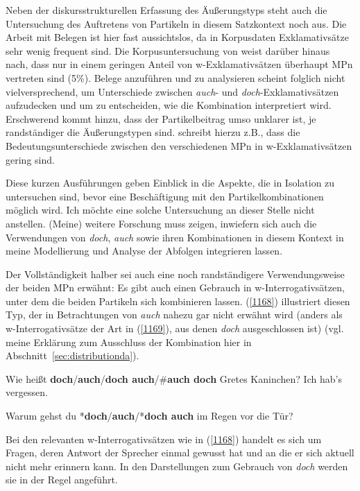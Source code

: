 {Neben der diskursstrukturellen Erfassung des Äußerungstyps steht auch die Untersuchung des Auftretens von Partikeln in diesem Satzkontext noch aus. Die Arbeit mit Belegen ist hier fast aussichtslos, da in Korpusdaten Exklamativsätze sehr wenig frequent sind. Die Korpusuntersuchung von \citet{Naef1996} weist darüber hinaus nach, dass nur in einem geringen Anteil von w-Exklamativsätzen  überhaupt MPn vertreten sind (5\%). Belege anzuführen und zu analysieren scheint folg\-lich nicht vielversprechend, um Unterschiede zwischen \textit{auch}- und \textit{doch}-Exkla\-mativsätzen aufzudecken und um zu entscheiden, wie die Kombination interpretiert wird. Erschwerend kommt hinzu, dass der Partikelbeitrag umso unklarer ist, je randständiger die Äußerungstypen sind. \citet[637]{Thurmair2013} schreibt hierzu z.B., dass die Bedeutungsunterschiede zwischen den verschiedenen MPn in w-Exklamativsätzen gering sind. 

Diese kurzen Ausführungen geben Einblick in die Aspekte, die in Isolation zu untersuchen sind, bevor eine Beschäftigung mit den Partikelkombinationen möglich wird. Ich möchte eine solche Untersuchung an dieser Stelle nicht anstellen. (Meine) weitere Forschung muss zeigen, inwiefern sich auch die Verwendungen von \textit{doch}, \textit{auch} sowie ihren Kombinationen in diesem Kontext in meine Modellierung und Analyse der Abfolgen integrieren lassen.

Der Vollständigkeit halber sei auch eine noch randständigere Verwendungsweise der beiden MPn erwähnt: Es gibt auch einen Gebrauch in w-Interrogativsätzen,  unter dem die beiden Partikeln sich kombinieren lassen. (\ref{1168}) illustriert diesen Typ, der in Betrachtungen von \textit{auch} nahezu gar nicht erwähnt wird (anders als w-Interrogativsätze der Art in (\ref{1169}), aus denen \textit{doch} ausgeschlossen ist) (vgl. meine Erklärung zum Ausschluss der Kombination hier in Abschnitt~\ref{sec:distributionda}).

\begin{exe}
	\ex\label{1168} 
	Wie heißt \textbf{doch}/\textbf{auch}/\textbf{doch auch}/\#\textbf{auch doch} Gretes Kaninchen? Ich hab's vergessen.
\end{exe}
\vspace{-0.6cm}	
\begin{exe}
	\ex\label{1169} 
	Warum gehst du *\textbf{doch}/\textbf{auch}/*\textbf{doch auch} im Regen vor die Tür?
\end{exe}	
Bei den relevanten w-Interrogativsätzen wie in (\ref{1168}) handelt es sich um Fragen, deren Antwort der Sprecher einmal gewusst hat und an die er sich aktuell nicht mehr erinnern kann. In den Darstellungen zum Gebrauch von \textit{doch} werden sie in der Regel angeführt.

}
